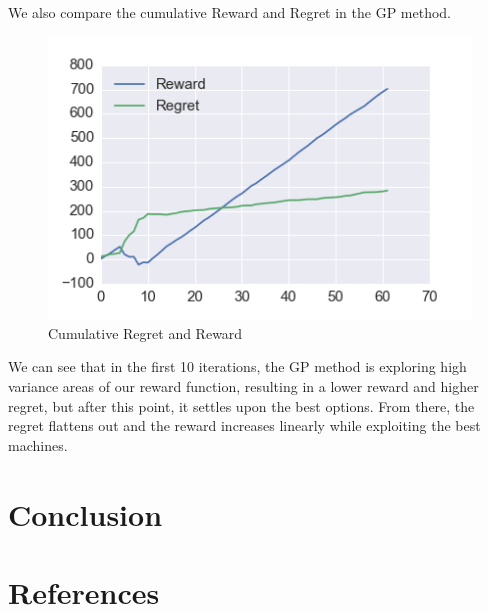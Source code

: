 \documentclass{article}
\begin{document}
We also compare the cumulative Reward and Regret in the GP method.

\begin{figure}[H]
\centering
\includegraphics[scale=0.8]{reward_regret.png}
\caption{Cumulative Regret and Reward}
\end{figure}

We can see that in the first 10 iterations, the GP method is exploring high variance areas of our reward function, resulting in a lower reward and higher regret, but after this point, it settles upon the best options. From there, the regret flattens out and the reward increases linearly while exploiting the best machines.

\section{Conclusion}

\section{References}
\end{document}
